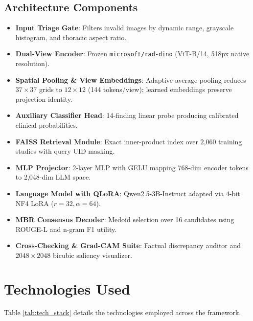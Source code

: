\documentclass[12pt,a4paper]{report}
\begin{document}
\section{Architecture Components}
\begin{itemize}
    \item \textbf{Input Triage Gate}: Filters invalid images by dynamic range, grayscale histogram, and thoracic aspect ratio.
    \item \textbf{Dual-View Encoder}: Frozen \texttt{microsoft/rad-dino} (ViT-B/14, 518px native resolution).
    \item \textbf{Spatial Pooling \& View Embeddings}: Adaptive average pooling reduces $37 \times 37$ grids to $12 \times 12$ (144 tokens/view); learned embeddings preserve projection identity.
    \item \textbf{Auxiliary Classifier Head}: 14-finding linear probe producing calibrated clinical probabilities.
    \item \textbf{FAISS Retrieval Module}: Exact inner-product index over 2,060 training studies with query UID masking.
    \item \textbf{MLP Projector}: 2-layer MLP with GELU mapping 768-dim encoder tokens to 2,048-dim LLM space.
    \item \textbf{Language Model with QLoRA}: Qwen2.5-3B-Instruct adapted via 4-bit NF4 LoRA ($r=32, \alpha=64$).
    \item \textbf{MBR Consensus Decoder}: Medoid selection over 16 candidates using ROUGE-L and n-gram F1 utility.
    \item \textbf{Cross-Checking & Grad-CAM Suite}: Factual discrepancy auditor and $2048 \times 2048$ bicubic saliency visualizer.
\end{itemize}

\chapter{Technologies Used}

Table \ref{tab:tech_stack} details the technologies employed across the framework.
\end{document}
